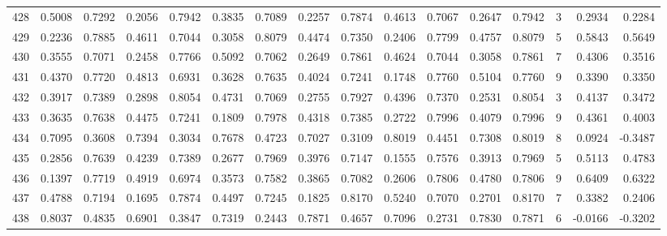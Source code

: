 \begin{tabular}{lrrrrrrrrrrrrrrr}
428 &      0.5008 &  0.7292 &  0.2056 &  0.7942 &  0.3835 &  0.7089 &  0.2257 &  0.7874 &  0.4613 &  0.7067 &   0.2647 &     0.7942 &      3 &                    0.2934 &                     0.2284 \\
429 &      0.2236 &  0.7885 &  0.4611 &  0.7044 &  0.3058 &  0.8079 &  0.4474 &  0.7350 &  0.2406 &  0.7799 &   0.4757 &     0.8079 &      5 &                    0.5843 &                     0.5649 \\
430 &      0.3555 &  0.7071 &  0.2458 &  0.7766 &  0.5092 &  0.7062 &  0.2649 &  0.7861 &  0.4624 &  0.7044 &   0.3058 &     0.7861 &      7 &                    0.4306 &                     0.3516 \\
431 &      0.4370 &  0.7720 &  0.4813 &  0.6931 &  0.3628 &  0.7635 &  0.4024 &  0.7241 &  0.1748 &  0.7760 &   0.5104 &     0.7760 &      9 &                    0.3390 &                     0.3350 \\
432 &      0.3917 &  0.7389 &  0.2898 &  0.8054 &  0.4731 &  0.7069 &  0.2755 &  0.7927 &  0.4396 &  0.7370 &   0.2531 &     0.8054 &      3 &                    0.4137 &                     0.3472 \\
433 &      0.3635 &  0.7638 &  0.4475 &  0.7241 &  0.1809 &  0.7978 &  0.4318 &  0.7385 &  0.2722 &  0.7996 &   0.4079 &     0.7996 &      9 &                    0.4361 &                     0.4003 \\
434 &      0.7095 &  0.3608 &  0.7394 &  0.3034 &  0.7678 &  0.4723 &  0.7027 &  0.3109 &  0.8019 &  0.4451 &   0.7308 &     0.8019 &      8 &                    0.0924 &                    -0.3487 \\
435 &      0.2856 &  0.7639 &  0.4239 &  0.7389 &  0.2677 &  0.7969 &  0.3976 &  0.7147 &  0.1555 &  0.7576 &   0.3913 &     0.7969 &      5 &                    0.5113 &                     0.4783 \\
436 &      0.1397 &  0.7719 &  0.4919 &  0.6974 &  0.3573 &  0.7582 &  0.3865 &  0.7082 &  0.2606 &  0.7806 &   0.4780 &     0.7806 &      9 &                    0.6409 &                     0.6322 \\
437 &      0.4788 &  0.7194 &  0.1695 &  0.7874 &  0.4497 &  0.7245 &  0.1825 &  0.8170 &  0.5240 &  0.7070 &   0.2701 &     0.8170 &      7 &                    0.3382 &                     0.2406 \\
438 &      0.8037 &  0.4835 &  0.6901 &  0.3847 &  0.7319 &  0.2443 &  0.7871 &  0.4657 &  0.7096 &  0.2731 &   0.7830 &     0.7871 &      6 &                   -0.0166 &                    -0.3202 \\

\end{tabular}
